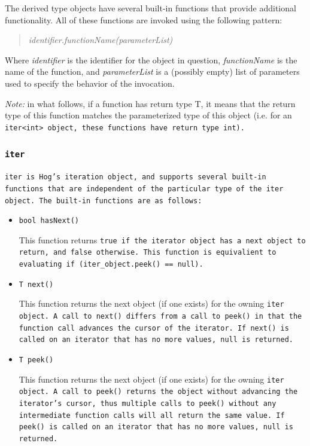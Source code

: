 \documentclass{article}
\begin{document}
The derived type objects have several built-in functions that provide additional functionality. All of these functions
are invoked using the following pattern:

\begin{quotation}
\emph{identifier.functionName(parameterList)}
\end{quotation}

\noindent Where \emph{identifier} is the identifier for the object in question, \emph{functionName} is the name of the
function, and \emph{parameterList} is a (possibly empty) list of parameters used to specify the behavior of the invocation.

\emph{Note:} in what follows, if a function has return type T, it means that the return type of this function matches the
parameterized type of this object (i.e. for an \tt iter<int> \rm object, these functions have return type \tt int\rm).

\subsubsection{\tt iter \rm} %
\label{ssub:iter}

\tt iter \rm is Hog's iteration object, and supports several built-in functions
that are independent of the particular type of the \tt iter \rm object. The built-in functions are as follows:

\begin{itemize}

\item[] \tt bool hasNext() \rm

This function returns \tt true \rm if the iterator object has a next object
to return, and \tt false \rm otherwise. This function is equivalient to evaluating
\tt if (iter\_object.peek() == null)\rm.

\item[] \tt T next() \rm

This function returns the next object (if one exists) for the owning \tt iter \rm
object. A call to \tt next() \rm differs from a call to \tt peek() \rm in that the
function call advances the cursor of the iterator. If \tt next() \rm is called on
an iterator that has no more values, \tt null \rm is returned.

\item[] \tt T peek() \rm

This function returns the next object (if one exists) for the owning \tt iter \rm
object. A call to \tt peek() \rm returns the object without advancing the iterator's
cursor, thus multiple calls to \tt peek() \rm without any intermediate function calls
will all return the same value. If \tt peek() \rm is called on an iterator that has
no more values, \tt null \rm is returned. 

\end{itemize} 
\end{document}
